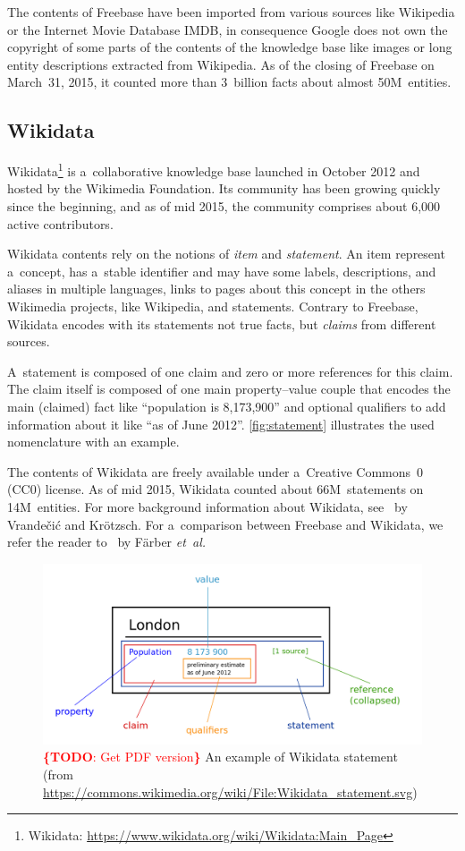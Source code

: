 \documentclass{sig-alternate}
\newcommand{\todo}[1]{\noindent\textcolor{red}{{\bf \{TODO}: #1{\bf \}}}}
\begin{document}
The contents of Freebase have been imported from various sources like Wikipedia
or the Internet Movie Database IMDB,
in consequence Google does not own the copyright of some parts of the contents of the knowledge base
like images or long entity descriptions extracted from Wikipedia.
As of the closing of Freebase on March~31, 2015,
it counted more than 3~billion facts about almost 50M~entities.

\subsection{Wikidata}

Wikidata\footnote{Wikidata: \url{https://www.wikidata.org/wiki/Wikidata:Main_Page}}
is a~collaborative knowledge base
launched in October 2012 and hosted by the Wikimedia Foundation.
Its community has been growing quickly since the beginning, and as of mid 2015,
the community comprises about 6,000 active contributors.

Wikidata contents rely on the notions of \emph{item} and \emph{statement}.
An item represent a~concept, has a~stable identifier and may have some labels,
descriptions, and aliases in multiple languages, links to pages about this concept
in the others Wikimedia projects, like Wikipedia, and statements.
Contrary to Freebase, Wikidata encodes with its statements not true facts,
but \emph{claims} from different sources.

A~statement is composed of one claim and zero or more references for this claim.
The claim itself is composed of one main property--value couple that encodes
the main (claimed) fact like ``population is 8,173,900'' and optional qualifiers
to add information about it like ``as of June 2012''.
\autoref{fig:statement} illustrates the used nomenclature with an example.

The contents of Wikidata are freely available under a~Creative Commons~0 (CC0) license.
As of mid 2015, Wikidata counted about 66M~statements on 14M~entities.
For more background information about Wikidata, see~\cite{vrandevcic2014wikidata}
by Vrandečić and Krötzsch.
For a~comparison between Freebase and Wikidata,
we refer the reader to~\cite{farbercomparative} by Färber \emph{et~al.}

\begin{figure}[!htbp]
\centering
\includegraphics[width=8.45 cm]{img/Wikidata-statement.png}
\caption{\todo{Get PDF version} An example of Wikidata statement (from
	\url{https://commons.wikimedia.org/wiki/File:Wikidata_statement.svg})}
\label{fig:statement}
\end{figure}
\end{document}
